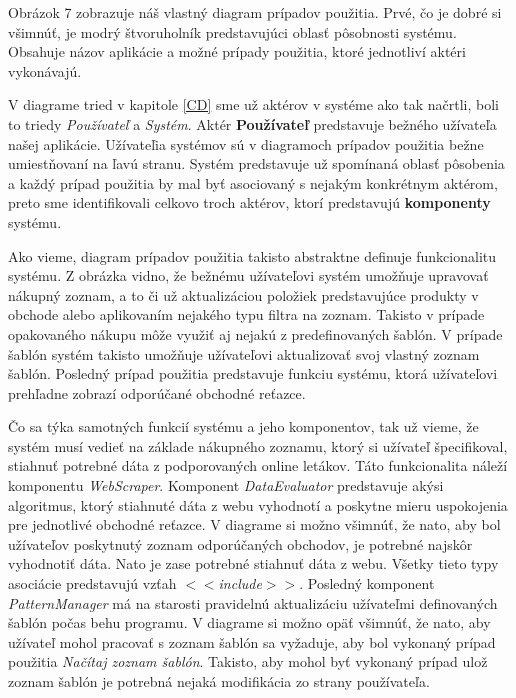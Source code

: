 \documentclass[twoside,slovak, a4paper]{article}
\begin{document}
Obrázok 7 zobrazuje náš vlastný diagram prípadov použitia. Prvé, čo je dobré si všimnúť, je modrý štvoruholník predstavujúci oblasť pôsobnosti systému. Obsahuje názov aplikácie a možné prípady použitia, ktoré jednotliví aktéri vykonávajú.\cite{von2002modeling}

V diagrame tried v kapitole \ref{CD} sme už aktérov v systéme ako tak načrtli, boli to triedy \textit{Používateľ} a \textit{Systém}. Aktér \textbf{Používateľ} predstavuje bežného užívateľa našej aplikácie. Užívateľia systémov sú v diagramoch prípadov použitia bežne umiestňovaní na ľavú stranu.  Systém predstavuje už spomínaná oblasť pôsobenia a každý prípad použitia by mal byť asociovaný s nejakým konkrétnym aktérom, preto sme identifikovali celkovo troch aktérov, ktorí predstavujú \textbf{komponenty} systému.

Ako vieme, diagram prípadov použitia takisto abstraktne definuje funkcionalitu systému. Z obrázka vidno, že bežnému užívateľovi systém umožňuje upravovať nákupný zoznam, a to či už aktualizáciou položiek predstavujúce produkty v obchode alebo aplikovaním nejakého typu filtra na zoznam. Takisto v prípade opakovaného nákupu môže využiť aj nejakú z predefinovaných šablón. V prípade šablón systém takisto umožňuje užívateľovi aktualizovať svoj vlastný zoznam šablón. Posledný prípad použitia predstavuje funkciu systému, ktorá užívateľovi prehľadne zobrazí odporúčané obchodné reťazce.

Čo sa týka samotných funkcií systému a jeho komponentov, tak už vieme, že systém musí vedieť na základe nákupného zoznamu, ktorý si užívateľ špecifikoval, stiahnuť potrebné dáta z podporovaných online letákov. Táto funkcionalita náleží komponentu \textit{WebScraper}. Komponent \textit{DataEvaluator} predstavuje akýsi algoritmus, ktorý stiahnuté dáta z webu vyhodnotí a poskytne mieru uspokojenia pre jednotlivé obchodné reťazce. V diagrame si možno všimnúť, že nato, aby bol užívateľov poskytnutý zoznam odporúčaných obchodov, je potrebné najskôr vyhodnotiť dáta. Nato je zase potrebné stiahnuť dáta z webu. Všetky tieto typy asociácie predstavujú vzťah \textit{$<<$include$>>$}. Posledný komponent \textit{PatternManager} má na starosti pravidelnú aktualizáciu užívateľmi definovaných šablón počas behu programu. V diagrame si možno opäť všimnúť, že nato, aby užívateľ mohol pracovať s zoznam šablón sa vyžaduje, aby bol vykonaný prípad použitia \textit{Načítaj zoznam šablón}. Takisto, aby mohol byť vykonaný prípad ulož zoznam šablón je potrebná nejaká modifikácia zo strany používateľa.
\end{document}
